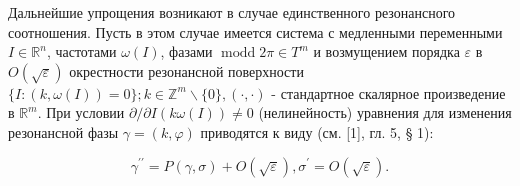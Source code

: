 \documentclass[10pt]{article}
\begin{document}
Дальнейшие упрощения возникают в случае единственного резонансного соотношения. Пусть в этом случае имеется система с медленными переменными $I \in \mathbb{R}^{n}$, частотами $\omega(I)$, фазами $\operatorname{modd} 2 \pi \in T^{m}$ и возмущением порядка $\varepsilon$ в $O(\sqrt{\varepsilon})$ окрестности резонансной поверхности $\{I:(k, \omega(I))=0\} ; k \in \mathbb{Z}^{m} \backslash\{0\},(\cdot, \cdot)$ - стандартное скалярное произведение в $\mathbb{R}^{m}$. При условии $\partial / \partial I(k \omega(I)) \neq 0$ (нелинейность) уравнения для изменения резонансной фазы $\gamma=(k, \varphi)$ приводятся к виду (см. [1], гл. 5, § 1):



\[

\gamma^{\prime \prime}=P(\gamma, \sigma)+O(\sqrt{\varepsilon}), \sigma^{\prime}=O(\sqrt{\varepsilon}) .

\]
\end{document}
